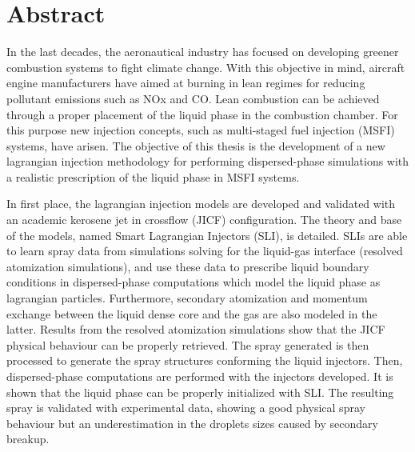 \chapter*{Abstract}
    
In the last decades, the aeronautical industry has focused on developing greener combustion systems to fight climate change. With this objective in mind, aircraft engine manufacturers have aimed at burning in lean regimes for reducing pollutant emissions such as NOx and CO. Lean combustion can be achieved through a proper placement of the liquid phase in the combustion chamber. For this purpose new injection concepts, such as multi-staged fuel injection (MSFI) systems, have arisen. The objective of this thesis is the development of a new lagrangian injection methodology for performing dispersed-phase simulations with a realistic prescription of the liquid phase in MSFI systems.

In first place, the lagrangian injection models are developed and validated with an academic kerosene jet in crossflow (JICF) configuration. The theory and base of the models, named Smart Lagrangian Injectors (SLI), is detailed. SLIs are able to learn spray data from simulations solving for the liquid-gas interface (resolved atomization simulations), and use these data to prescribe liquid boundary conditions in dispersed-phase computations which model the liquid phase as lagrangian particles. Furthermore, secondary atomization and momentum exchange between the liquid dense core and the gas are also modeled in the latter.  Results from the resolved atomization simulations show that the JICF physical behaviour can be properly retrieved. The spray generated is then processed to generate the spray structures conforming the liquid injectors. Then, dispersed-phase computations are performed with the injectors developed. It is shown that the liquid phase can be properly initialized with SLI. The resulting spray is validated with experimental data, showing a good physical spray behaviour but an underestimation in the droplets sizes caused by secondary breakup. %

